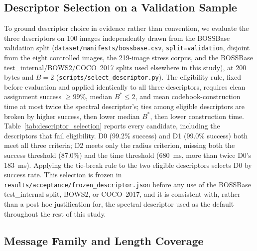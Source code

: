 \documentclass[preprint,12pt]{elsarticle}
\theoremstyle{plain}
\providecommand{\DIFaddtex}[1]{{\protect\color{blue} \sf #1}} %
\providecommand{\DIFdeltex}[1]{{\protect\color{red} \scriptsize #1}} %
\providecommand{\DIFaddbegin}{} %
\providecommand{\DIFaddend}{} %
\providecommand{\DIFdelbegin}{} %
\providecommand{\DIFdelend}{} %
\providecommand{\DIFadd}[1]{\texorpdfstring{\DIFaddtex{#1}}{#1}} %
\providecommand{\DIFdel}[1]{\texorpdfstring{\DIFdeltex{#1}}{}} %
\providecommand{\DIFscaledelfig}{0.5}
\newlength{\DIFdelgraphicswidth} %
\newlength{\DIFdelgraphicsheight} %
\providecommand{\DIFaddincludegraphics}[2][]{{\color{blue}\fbox{\DIFOincludegraphics[#1]{#2}}}} %
\providecommand{\DIFdelincludegraphics}[2][]{%
\sbox{\DIFdelgraphicsbox}{\DIFOincludegraphics[#1]{#2}}%
\settoboxwidth{\DIFdelgraphicswidth}{\DIFdelgraphicsbox} %
\settoboxtotalheight{\DIFdelgraphicsheight}{\DIFdelgraphicsbox} %
\scalebox{\DIFscaledelfig}{%
\parbox[b]{\DIFdelgraphicswidth}{\usebox{\DIFdelgraphicsbox}\\[-\baselineskip] \rule{\DIFdelgraphicswidth}{0em}}\llap{\resizebox{\DIFdelgraphicswidth}{\DIFdelgraphicsheight}{%
\setlength{\unitlength}{\DIFdelgraphicswidth}%
\begin{picture}(1,1)%
\thicklines\linethickness{2pt} %
{\color[rgb]{1,0,0}\put(0,0){\framebox(1,1){}}}%
{\color[rgb]{1,0,0}\put(0,0){\line( 1,1){1}}}%
{\color[rgb]{1,0,0}\put(0,1){\line(1,-1){1}}}%
\end{picture}%
}\hspace*{3pt}}} %
} %
\DeclareRobustCommand{\DIFaddbegin}{\DIFOaddbegin \let\includegraphics\DIFaddincludegraphics} %
\DeclareRobustCommand{\DIFaddend}{\DIFOaddend \let\includegraphics\DIFOincludegraphics} %
\DeclareRobustCommand{\DIFdelbegin}{\DIFOdelbegin \let\includegraphics\DIFdelincludegraphics} %
\DeclareRobustCommand{\DIFdelend}{\DIFOaddend \let\includegraphics\DIFOincludegraphics} %
\renewcommand{\DIFdel}[1]{}
\renewcommand{\DIFdelincludegraphics}[2][]{}
\begin{document}
\subsection{Descriptor Selection on a Validation Sample}

To ground descriptor choice in evidence rather than convention, we evaluate
the three descriptors on 100 images independently drawn from the BOSSBase
validation split (\texttt{dataset/manifests/bossbase.csv}, \texttt{split=validation},
disjoint from the eight controlled images, the 219-image stress corpus, and
the BOSSBase test\_internal/BOWS2/COCO~2017 splits used elsewhere in this
study), at 200 bytes and $B=2$ (\texttt{scripts/select\_descriptor.py}). The
eligibility rule, fixed before evaluation and applied identically to all
three descriptors, requires clean assignment success $\geq99\%$,
median $B^\ast\leq2$, and mean codebook-construction time \DIFdelbegin \DIFdel{no more than }\DIFdelend \DIFaddbegin \DIFadd{at most }\DIFaddend twice
the spectral descriptor's; ties among eligible descriptors are broken by
higher success, then lower median $B^\ast$, then lower construction time.
Table~\ref{tab:descriptor_selection} reports every candidate, including the
descriptors that fail eligibility. D0 (99.2\% success) and D1 (99.0\% success)
both meet all three criteria; D2 meets only the radius criterion, missing
both the success threshold (87.0\%) and the time threshold (680~ms, more than
twice D0's 183~ms). Applying the tie-break rule to the two eligible
descriptors selects D0 by success rate. This selection is frozen in
\texttt{results/acceptance/frozen\_descriptor.json} before any use of the
BOSSBase test\_internal split, BOWS2, or COCO~2017, and it is consistent with,
rather than a post hoc justification for, the spectral descriptor used as the
default throughout the rest of this study.

\begin{table}[!t]
\centering
\caption{Descriptor Selection on 100 BOSSBase Validation Images (200 Bytes, $B=2$)}
\label{tab:descriptor_selection}

\end{table}

\subsection{Message Family and Length Coverage}
\end{document}
